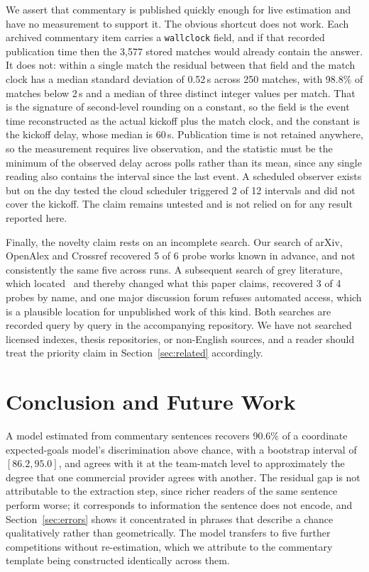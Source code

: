 \documentclass[conference]{IEEEtran}
\newcommand{\num}[1]{\mbox{#1}}
\begin{document}
We assert that commentary is published quickly enough for live estimation and
have no measurement to support it. The obvious shortcut does not work. Each
archived commentary item carries a \texttt{wallclock} field, and if that
recorded publication time then the \num{3,577} stored matches would already
contain the answer. It does not: within a single match the residual between
that field and the match clock has a median standard deviation of
\num{0.52}\,s across 250 matches, with 98.8\% of matches below \num{2}\,s
and a median of three distinct integer values per match. That is the signature
of second-level rounding on a constant, so the field is the event time
reconstructed as the actual kickoff plus the match clock, and the constant is
the kickoff delay, whose median is \num{60}\,s. Publication time is not
retained anywhere, so the measurement requires live observation, and the
statistic must be the minimum of the observed delay across polls rather than
its mean, since any single reading also contains the interval since the last
event. A scheduled observer exists but on the day tested the cloud scheduler
triggered 2 of 12 intervals and did not cover the kickoff. The claim remains
untested and is not relied on for any result reported here.

Finally, the novelty claim rests on an incomplete search. Our search of arXiv,
OpenAlex and Crossref recovered 5 of 6 probe works known in advance, and not
consistently the same five across runs. A subsequent search of grey literature,
which located~\cite{ballard2020moneyball} and thereby changed what this paper
claims, recovered 3 of 4 probes by name, and one major discussion forum refuses
automated access, which is a plausible location for unpublished work of this
kind. Both searches are recorded query by query in the accompanying
repository. We have not searched licensed indexes, thesis repositories, or
non-English sources, and a reader should treat the priority claim in
Section~\ref{sec:related} accordingly.

\section{Conclusion and Future Work}

A model estimated from commentary sentences recovers 90.6\% of a coordinate
expected-goals model's discrimination above chance, with a bootstrap interval
of $[86.2, 95.0]$, and agrees with it at the team-match level to approximately
the degree that one commercial provider agrees with another. The residual gap
is not attributable to the extraction step, since richer readers of the same
sentence perform worse; it corresponds to information the sentence does not
encode, and Section~\ref{sec:errors} shows it concentrated in phrases that
describe a chance qualitatively rather than geometrically. The model transfers
to five further competitions without re-estimation, which we attribute to the
commentary template being constructed identically across them.
\end{document}

